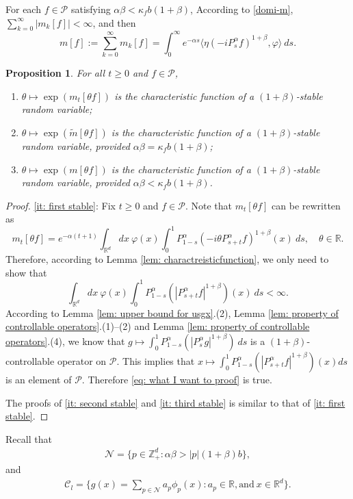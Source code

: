 \documentclass[12pt,a4paper]{amsart}
\theoremstyle{plain}
\newtheorem{prop}[thm]{Proposition}
\theoremstyle{definition}
\numberwithin{equation}{section}
\begin{document}
For each $f\in \mathcal{P}$ satisfying $\alpha\beta<\kappa_fb(1+\beta)$,
According to \eqref{domi-m}, $\sum_{k=0}^\infty |m_k[f]|<\infty$, and  then
\begin{equation}\label{sum-m}
m[f]
    :=\sum_{k=0}^\infty m_k[f]
    =\int_0^{\infty} e^{-\alpha s} \langle \eta (-iP_s^\alpha f)^{1+\beta}, \varphi \rangle~ds.
\end{equation}

\begin{prop}
\label{cor: alpha stable rv}
	For all $t\geq 0$ and $f\in \mathcal P$,
\begin{enumerate}
\item
\label{it: first stable}
    $\theta \mapsto \exp(m_t[\theta f])$ is the characteristic function of a $(1+\beta)$-stable random variable;
\item
\label{it: second stable}
    $\theta \mapsto \exp(\tilde m[\theta f])$ is the characteristic function of a $(1+\beta)$-stable random variable, provided $\alpha\beta=\kappa_f b(1+\beta)$;
\item
\label{it: third stable}
    $\theta \mapsto \exp(m[\theta f])$ is the characteristic function of a $(1+\beta)$-stable random variable, provided $\alpha\beta < \kappa_f b(1+\beta)$.
\end{enumerate}
\end{prop}
\begin{proof}
    \eqref{it: first stable}:
	Fix $t\geq 0$ and $f\in \mathcal P$.
	Note that $m_t[\theta f]$ can be rewritten as
\[
    m_t[\theta f]= e^{-\alpha (t+1)}\int_{\mathbb R^d} dx~\varphi(x)\int_0^1 P_{1-s}^\alpha (-i\theta P_{s+t}^\alpha f)^{1+\beta}(x)~ds,
    \quad \theta \in \mathbb R.
\]
	Therefore, according to Lemma \ref{lem: charactreisticfunction}, we only need to show that
\begin{equation}
\label{eq: what I want to proof}
	\int_{\mathbb R^d} dx~\varphi(x)\int_0^1 P_{1-s}^\alpha (|P_{s+t}^\alpha f|^{1+\beta})(x)~ds < \infty.
\end{equation}
	According to Lemma \ref{lem: upper bound for usgx}.(2), Lemma \ref{lem: property of controllable operators}.(1)--(2) and Lemma \ref{lem: property of controllable operators}.(4),  we know that
$
	g \mapsto \int_0^1 P_{1-s}^\alpha (|P_{s}^\alpha g|^{1+\beta})~ds
$
	is a $(1+\beta)$-controllable operator on $\mathcal P$.
	This implies that $x \mapsto \int_0^1 P_{1-s}^\alpha (|P_{s+t}^\alpha f|^{1+\beta})(x) ds$ is an element of $\mathcal P$.
	Therefore \eqref{eq: what I want to proof} is true.

    The proofs of \eqref{it: second stable} and \eqref{it: third stable}  is similar to that of \eqref{it: first stable}.
\end{proof}
Recall that
\begin{align}
   \mathcal{N}=\{p\in \mathbb{Z}_+^d:  \alpha\beta>|p|(1+\beta)b\},
\end{align}
and
\begin{align}
    \mathcal{C}_l=\Big\{g(x)=\sum_{p\in\mathcal{N}}a_p\phi_p(x): a_p\in \mathbb{R}, \text{and}~ x\in\mathbb{R}^d \Big\}.
\end{align}
\end{document}
